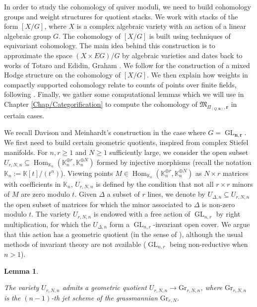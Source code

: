 \documentclass[11pt,english]{article}
\numberwithin{equation}{section}
\numberwithin{figure}{section}
\theoremstyle{definition}
\theoremstyle{plain}
\newtheorem{lem}[df]{Lemma}
\theoremstyle{remark}
\DeclareMathOperator{\Hom}{Hom}
\DeclareMathOperator{\GL}{GL}
\newcommand\nn{\mathbf{n}}
\newcommand\rr{\mathbf{r}}
\newcommand\KK{\mathbb{K}}
\begin{document}
In order to study the cohomology of quiver moduli, we need to build
cohomology groups and weight structures for quotient stacks. We work
with stacks of the form $\left[X/G\right]$, where $X$ is a complex
algebraic variety with an action of a linear algebraic group $G$.
The cohomology of $\left[X/G\right]$ is built using techniques of
equivariant cohomology. The main idea behind this construction is
to approximate the space $(X\times EG)/G$ by algebraic varieties
and dates back to works of Totaro and Edidin, Graham \cite{Tot99,EG98a}.
We follow \cite[\S 2.2.]{DM20} for the construction of a mixed Hodge
structure on the cohomology of $\left[X/G\right]$. We then explain
how weights in compactly supported cohomology relate to counts of
points over finite fields, following \cite[Appendix, Thm. 6.1.2.]{HRV08}.
Finally, we gather some computational lemmas which we will use in
Chapter \ref{Chap/Categorification} to compute the cohomology of
$\mathfrak{M}_{\Pi_{(Q,\nn)},\rr}$ in certain cases.

We recall Davison and Meinhardt's construction in the case where $G=\GL_{\nn,\rr}$.
We first need to build certain geometric quotients, inspired from
complex Stiefel manifolds. For $n,r\geq1$ and $N\geq1$ sufficiently
large, we consider the open subset $U_{r,N,n}\subseteq\Hom_{\KK_{n}}(\KK_{n}^{\oplus r},\KK_{n}^{\oplus N})$
formed by injective morphisms (recall the notation $\KK_{n}:=\KK[t]/(t^{n})$).
Viewing points $M\in\Hom_{\KK_{n}}(\KK_{n}^{\oplus r},\KK_{n}^{\oplus N})$
as $N\times r$ matrices with coefficients in $\KK_{n}$, $U_{r,N,n}$
is defined by the condition that not all $r\times r$ minors of $M$
are zero modulo $t$. Given $\Delta$ a subset of $r$ lines, we denote
by $U_{\Delta,n}\subseteq U_{r,N,n}$ the open subset of matrices
for which the minor associated to $\Delta$ is non-zero modulo $t$.
The variety $U_{r,N,n}$ is endowed with a free action of $\GL_{n,r}$
by right multiplication, for which the $U_{\Delta,n}$ form a $\GL_{n,r}$-invariant
open cover. We argue that this action has a geometric quotient (in
the sense of \cite[Def. 0.6.]{MFK94}), although the usual methods
of invariant theory are not available ($\GL_{n,r}$ being non-reductive
when $n>1$).

\begin{lem} \label{Lem/BorelApprox}

The variety $U_{r,N,n}$ admits a geometric quotient $U_{r,N,n}\rightarrow\mathrm{Gr}_{r,N,n}$,
where $\mathrm{Gr}_{r,N,n}$ is the $(n-1)$-th jet scheme of the
grassmannian $\mathrm{Gr}_{r,N}$.

\end{lem}
\end{document}
